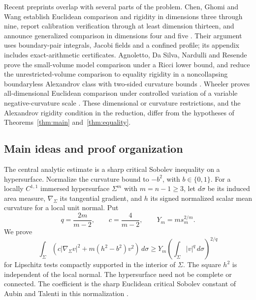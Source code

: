 Recent preprints overlap with several parts of the problem.
Chen, Ghomi and Wang establish Euclidean comparison and rigidity in
dimensions three through nine, report calibration verification through
at least dimension thirteen, and announce generalized comparison in
dimensions four and five
\cite[Theorems~1.1--1.2 and the subsequent discussion]{ChenGhomiWang2026HigherDimensions}.
Their argument uses boundary-pair integrals, Jacobi fields and a
confined profile; its appendix includes exact-arithmetic certificates.
Agnoletto, Da Silva, Nardulli and Resende prove the small-volume
model comparison under a Ricci lower bound, and reduce the
unrestricted-volume comparison to equality rigidity in a
noncollapsing boundaryless Alexandrov class with two-sided curvature
bounds \cite[Theorems~1.1 and 1.3, Assumption~1]{AgnolettoDaSilvaNardulliResende2026}.
Wheeler proves all-dimensional Euclidean comparison under controlled
variation of a variable negative-curvature scale
\cite[Theorem~1.1 and Definition~1.2]{Wheeler2026}.
These dimensional or curvature restrictions, and the Alexandrov
rigidity condition in the reduction, differ from the hypotheses of
Theorems~\ref{thm:main} and~\ref{thm:equality}.

\subsection{Main ideas and proof organization}

The central analytic estimate is a sharp critical Sobolev inequality
on a hypersurface. Normalize the curvature bound to $-b^2$, with
$b\in\{0,1\}$. For a locally $C^{1,1}$ immersed hypersurface
$\Sigma^m$ with $m=n-1\ge3$, let $d\sigma$ be its induced area
measure, $\nabla_\Sigma$ its tangential gradient, and $h$ its signed
normalized scalar mean curvature for a local unit normal. Put
\[
 q=\frac{2m}{m-2},\qquad c=\frac4{m-2},\qquad Y_m=m s_m^{2/m}.
\]
We prove
\begin{equation}\label{eq:intro-sobolev}
 \int_\Sigma\left(c|\nabla_\Sigma v|^2+m(h^2-b^2)v^2\right)\,d\sigma
 \ge Y_m\left(\int_\Sigma|v|^q\,d\sigma\right)^{2/q}
\end{equation}
for Lipschitz tests compactly supported in the interior of $\Sigma$.
The square $h^2$ is independent of the local normal. The hypersurface
need not be complete or connected. The coefficient is the sharp
Euclidean critical Sobolev constant of Aubin and Talenti in this
normalization \cite{Aubin1976,Talenti1976}.

